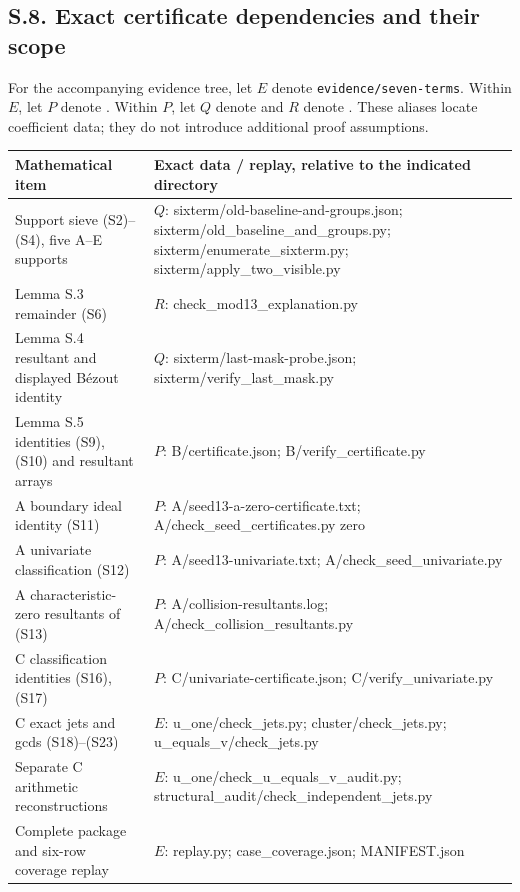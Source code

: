 \documentclass[
  british,
  10pt,
]{article}
\newcounter{none} %
\begin{document}
\subsection{S.8. Exact certificate dependencies and their
scope}\label{s.8.-exact-certificate-dependencies-and-their-scope}

For the accompanying evidence tree, let \(E\) denote
\texttt{evidence/seven-terms}. Within \(E\), let \(P\) denote
. Within \(P\), let \(Q\) denote
 and \(R\) denote
. These aliases locate
coefficient data; they do not introduce additional proof assumptions.

{\def\LTcaptype{none} %
\begin{longtable}[]{@{}
  >{\raggedright\arraybackslash}p{}
  >{\raggedright\arraybackslash}p{}@{}}
\toprule\noalign{}
\begin{minipage}[b]{\linewidth}\raggedright
Mathematical item
\end{minipage} & \begin{minipage}[b]{\linewidth}\raggedright
Exact data / replay, relative to the indicated directory
\end{minipage} \\
\midrule\noalign{}
\endhead
\bottomrule\noalign{}
\endlastfoot
Support sieve (S2)--(S4), five A--E supports & \(Q\):
sixterm/old-baseline-and-groups.json;
sixterm/old\_baseline\_and\_groups.py; sixterm/enumerate\_sixterm.py;
sixterm/apply\_two\_visible.py \\
Lemma S.3 remainder (S6) & \(R\): check\_mod13\_explanation.py \\
Lemma S.4 resultant and displayed Bézout identity & \(Q\):
sixterm/last-mask-probe.json; sixterm/verify\_last\_mask.py \\
Lemma S.5 identities (S9), (S10) and resultant arrays & \(P\):
B/certificate.json; B/verify\_certificate.py \\
A boundary ideal identity (S11) & \(P\):
A/seed13-a-zero-certificate.txt; A/check\_seed\_certificates.py zero \\
A univariate classification (S12) & \(P\): A/seed13-univariate.txt;
A/check\_seed\_univariate.py \\
A characteristic-zero resultants of (S13) & \(P\):
A/collision-resultants.log; A/check\_collision\_resultants.py \\
C classification identities (S16), (S17) & \(P\):
C/univariate-certificate.json; C/verify\_univariate.py \\
C exact jets and gcds (S18)--(S23) & \(E\): u\_one/check\_jets.py;
cluster/check\_jets.py; u\_equals\_v/check\_jets.py \\
Separate C arithmetic reconstructions & \(E\):
u\_one/check\_u\_equals\_v\_audit.py;
structural\_audit/check\_independent\_jets.py \\
Complete package and six-row coverage replay & \(E\): replay.py;
case\_coverage.json; MANIFEST.json \\
\end{longtable}
}
\end{document}
